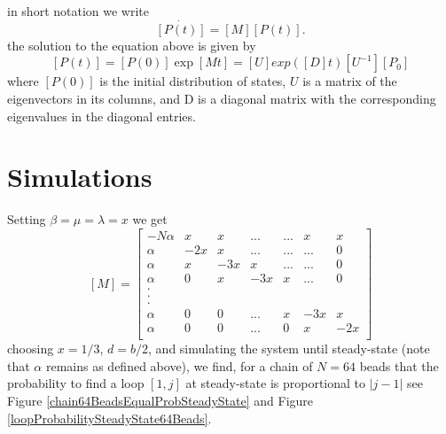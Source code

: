 \documentclass[12pt]{article}
\begin{document}
in short notation we write 
\begin{equation*}
\dot{\left[P(t)\right]}=\left[M\right]\left[ P(t)\right]. 
\end{equation*}
the solution to the equation above is given by 
\begin{equation*}
\left[P(t)\right]=\left[P(0)\right]\exp{\left[ Mt\right]}=\left[U\right]exp(\left[D\right]t)\left[U^{-1}\right]\left[P_0\right]
\end{equation*}
where $\left[P(0)\right]$ is the initial distribution of states, $U$ is a matrix of the eigenvectors in its columns, and D is a diagonal matrix with the corresponding  eigenvalues in the diagonal entries.

\section{Simulations}
Setting $\beta=\mu=\lambda=x$ we get 
\begin{equation*}
\left[M\right]=
\left[\begin{matrix}
-N\alpha & x   & x   & ... &... & x & x \\
\alpha   & -2x & x   & ... &... &...& 0 \\
\alpha   & x   & -3x & x   &... &...& 0 \\
\alpha   & 0   & x   & -3x & x  &...& 0 \\
.\\
.\\
.\\
\alpha   & 0   & 0   &...  & x  &-3x& x \\
\alpha   & 0   & 0   &...  &  0 & x &-2x\\
\end{matrix}\right] 
\end{equation*}
choosing $x=1/3$, $d=b/2$, and simulating the system until steady-state (note that $\alpha$ remains as defined above), we find, for a chain of $N=64$ beads that the probability to find a loop $[1,j]$ at steady-state is proportional to $|j-1|$ see Figure \ref{chain64BeadsEqualProbSteadyState} and Figure \ref{loopProbabilitySteadyState64Beads}.
\end{document}
